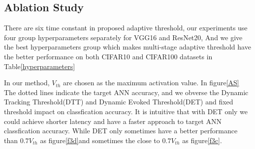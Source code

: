 \documentclass{article}
\begin{document}
\subsection{Ablation Study}
There are six time constant in proposed adaptive threshold, our experiments use four group hyperparameters separately for VGG16 and ResNet20, And we give the best hyperparameters group which makes multi-stage adaptive threshold have the better performance on both CIFAR10 and CIFAR100 datasets in Table\ref{hyperparameters}
\begin{table}[!t]
  \centering
  \caption{Summary of given hyperparameters on different network}
  \label{hyperparameters}
\end{table}

In our method, $V_{th}$ are chosen as the maximum activation value. In figure\ref{AS} The dotted lines indicate the target ANN accuracy, 
and we obverse the Dynamic Tracking Threshold(DTT) and Dynamic Evoked Threshold(DET) and fixed threshold impact on classfication accuracy.
It is intuitive that with DET only we could achieve shorter latency and have a faster approach to target ANN classfication accuracy. 
While DET only sometimes have a better performance than $0.7V_{th}$ as figure\ref{f3d}and sometimes the close to $0.7V_{th}$ as figure\ref{f3c}.
\end{document}
